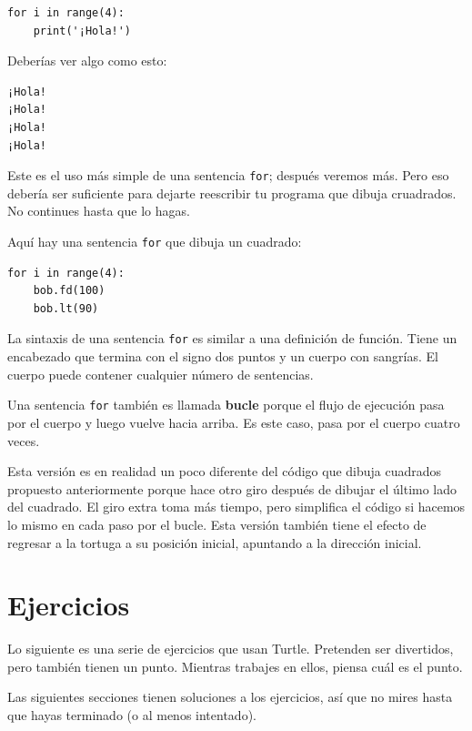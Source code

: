 \documentclass[10pt]{book}
\begin{document}
\begin{verbatim}
for i in range(4):
    print('¡Hola!')
\end{verbatim}
%
Deberías ver algo como esto:

\begin{verbatim}
¡Hola!
¡Hola!
¡Hola!
¡Hola!
\end{verbatim}
%
Este es el uso más simple de una sentencia {\tt for}; después veremos
más.  Pero eso debería ser suficiente para dejarte reescribir tu
programa que dibuja cruadrados.  No continues hasta que lo hagas.

Aquí hay una sentencia {\tt for} que dibuja un cuadrado:

\begin{verbatim}
for i in range(4):
    bob.fd(100)
    bob.lt(90)
\end{verbatim}
%
La sintaxis de una sentencia {\tt for} es similar a una definición
de función.  Tiene un encabezado que termina con el signo dos puntos y un cuerpo
con sangrías.  El cuerpo puede contener cualquier número de sentencias.

Una sentencia {\tt for} también es llamada {\bf bucle} porque
el flujo de ejecución pasa por el cuerpo y luego vuelve
hacia arriba.  Es este caso, pasa por el cuerpo cuatro veces.

Esta versión es en realidad un poco diferente del código
que dibuja cuadrados propuesto anteriormente porque hace otro giro después
de dibujar el último lado del cuadrado.  El giro extra toma
más tiempo, pero simplifica el código si hacemos lo mismo
en cada paso por el bucle.  Esta versión también tiene el efecto
de regresar a la tortuga a su posición inicial, apuntando a
la dirección inicial.

\section{Ejercicios}

Lo siguiente es una serie de ejercicios que usan Turtle.  Pretenden
ser divertidos, pero también tienen un punto.  Mientras trabajes en
ellos, piensa cuál es el punto.

Las siguientes secciones tienen soluciones a los ejercicios, así que
no mires hasta que hayas terminado (o al menos intentado).
\end{document}
